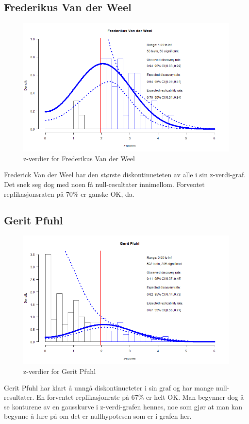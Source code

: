 \documentclass[doc,norsk]{apa7}
\begin{document}
\subsection{Frederikus Van der Weel}
\begin{figure}[h!]
    \centering
    \includegraphics[width=\textwidth]{images/Frederikus Van der Weel.png}
    \caption{z-verdier for Frederikus Van der Weel}
\end{figure}
Frederick Van der Weel har den største diskontinueteten av alle i sin z-verdi-graf. Det snek seg dog med noen få null-resultater innimellom. Forventet replikasjonsraten på 70\% er ganske OK, da.

\subsection{Gerit Pfuhl}
\begin{figure}[h!]
    \centering
    \includegraphics[width=\textwidth]{images/Gerit Pfuhl.png}
    \caption{z-verdier for Gerit Pfuhl}
\end{figure}
Gerit Pfuhl har klart å unngå diskontinueteter i sin graf og har mange null-resultater. En forventet replikasjonrate på 67\% er helt OK. Man begynner dog å se konturene av en gausskurve i z-verdi-grafen hennes, noe som gjør at man kan begynne å lure på om det er nullhypotesen som er i grafen her.
\end{document}
